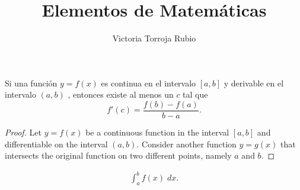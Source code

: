 \documentclass{report}
\begin{document}
\title{Elementos de Matemáticas}
\author{Victoria Torroja Rubio}
\date{}

\maketitle

\tableofcontents

\pagebreak


\begin{ftheorem}
	\normalfont Si una función $ y = f(x) $ es continua en el intervalo $ [a,b] $ y derivable en el intervalo $ (a,b) $ , entonces existe al menos un $ c $ tal que 
	\[f'(c) = \frac{f(b) - f(a)}{b - a} .\]
\end{ftheorem}
\begin{proof}
	Let $ y = f(x) $ be a continuous function in the interval $ [a,b] $ and differentiable on the interval $ (a,b) $.  Consider another function $ y = g(x) $ that intersects the original function on two different points, namely $ a $ and $ b $. 
\end{proof}

\[
\begin{split}
\int^{b}_{a} f(x) \; dx  .
\end{split}
\]
\end{document}

